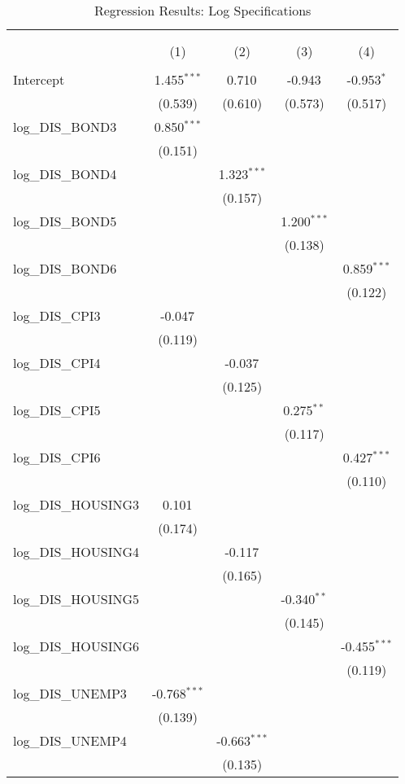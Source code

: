 \begin{table}[!htbp] \centering
  \caption{Regression Results: Log Specifications}
\begin{tabular}{@{\extracolsep{5pt}}lcccc}
\\[-1.8ex]\hline
\hline \\[-1.8ex]
\\[-1.8ex] & (1) & (2) & (3) & (4) \\
\hline \\[-1.8ex]
 Intercept & 1.455$^{***}$ & 0.710$^{}$ & -0.943$^{}$ & -0.953$^{*}$ \\
& (0.539) & (0.610) & (0.573) & (0.517) \\
 log_DIS_BOND3 & 0.850$^{***}$ & & & \\
& (0.151) & & & \\
 log_DIS_BOND4 & & 1.323$^{***}$ & & \\
& & (0.157) & & \\
 log_DIS_BOND5 & & & 1.200$^{***}$ & \\
& & & (0.138) & \\
 log_DIS_BOND6 & & & & 0.859$^{***}$ \\
& & & & (0.122) \\
 log_DIS_CPI3 & -0.047$^{}$ & & & \\
& (0.119) & & & \\
 log_DIS_CPI4 & & -0.037$^{}$ & & \\
& & (0.125) & & \\
 log_DIS_CPI5 & & & 0.275$^{**}$ & \\
& & & (0.117) & \\
 log_DIS_CPI6 & & & & 0.427$^{***}$ \\
& & & & (0.110) \\
 log_DIS_HOUSING3 & 0.101$^{}$ & & & \\
& (0.174) & & & \\
 log_DIS_HOUSING4 & & -0.117$^{}$ & & \\
& & (0.165) & & \\
 log_DIS_HOUSING5 & & & -0.340$^{**}$ & \\
& & & (0.145) & \\
 log_DIS_HOUSING6 & & & & -0.455$^{***}$ \\
& & & & (0.119) \\
 log_DIS_UNEMP3 & -0.768$^{***}$ & & & \\
& (0.139) & & & \\
 log_DIS_UNEMP4 & & -0.663$^{***}$ & & \\
& & (0.135) & & \\

\end{tabular}
\end{table}
